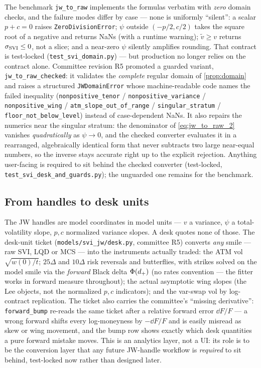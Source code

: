 \documentclass[11pt]{article}
\begin{document}
\begin{caution}
The benchmark \texttt{jw\_to\_raw} implements the formulas verbatim with
\emph{zero} domain checks, and the failure modes differ by case --- none is
uniformly ``silent'': a scalar $p+c=0$ raises \texttt{ZeroDivisionError};
$\psi$ outside $(-p/2,c/2)$ takes the square root of a negative and returns
NaNs (with a runtime warning); $\widetilde v\ge v$ returns $\sigma_{\mathrm{SVI}}\le0$, not
a slice; and a near-zero $\psi$ silently amplifies rounding. That contract is
test-locked (\texttt{test\_svi\_domain.py}) --- but production no longer
relies on the contract alone. Committee revision R5 promoted a guarded
variant, \texttt{jw\_to\_raw\_checked}: it validates the \emph{complete}
regular domain of \cref{prop:domain} and raises a structured
\texttt{JWDomainError} whose machine-readable code names the failed
inequality (\texttt{nonpositive\_tenor} / \texttt{nonpositive\_variance} /
\texttt{nonpositive\_wing} / \texttt{atm\_slope\_out\_of\_range} /
\texttt{singular\_stratum} / \texttt{floor\_not\_below\_level}) instead of
case-dependent NaNs. It also repairs the numerics near the singular stratum:
the denominator of \eqref{eq:jw_to_raw_2} vanishes \emph{quadratically} as
$\psi\to0$, and the checked converter evaluates it in a rearranged,
algebraically identical form that never subtracts two large near-equal
numbers, so the inverse stays accurate right up to the explicit rejection.
Anything user-facing is required to sit behind the checked converter
(test-locked, \texttt{test\_svi\_desk\_and\_guards.py}); the unguarded one
remains for the benchmark.
\end{caution}

\subsection{From handles to desk units}
\label{sec:desk}

The JW handles are model coordinates in model units --- $v$ a variance,
$\psi$ a total-volatility slope, $p,c$ normalized variance slopes. A desk
quotes none of those. The desk-unit ticket (\texttt{models/svi\_jw/desk.py},
committee R5) converts \emph{any} smile --- raw SVI, LQD or MCS --- into the
instruments actually traded: the ATM vol $\sqrt{w(0)/t}$; $25\Delta$ and
$10\Delta$ risk reversals and butterflies, with strikes solved on the model
smile via the \emph{forward} Black delta $\Phi(d_+)$ (no rates convention
--- the fitter works in forward measure throughout); the actual asymptotic
wing slopes (the Lee objects, not the normalized $p,c$ indicators); and the
var-swap vol by log-contract replication. The ticket also carries the
committee's ``missing derivative'': \texttt{forward\_bump} re-reads the same
ticket after a relative forward error $\dd F/F$ --- a wrong forward shifts
every log-moneyness by $-\dd F/F$ and is easily misread as skew or wing
movement, and the bump row shows exactly which desk quantities a pure forward
mistake moves. This is an analytics layer, not a UI: its role is to be the
conversion layer that any future JW-handle workflow is \emph{required} to sit
behind, test-locked now rather than designed later.
\end{document}
